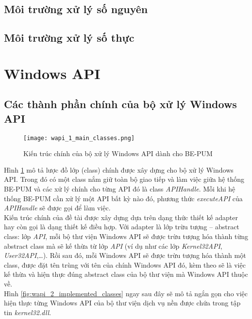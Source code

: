 	\subsection*{Môi trường xử lý số nguyên}
	
	\subsection*{Môi trường xử lý số thực}
		
\newpage
\section{Windows API}

	\subsection{Các thành phần chính của bộ xử lý Windows API} \label{sec:main_classes}

	\begin{figure}[htp]
	\centering
		\texttt{[image: wapi\_1\_main\_classes.png]}
		\caption{Kiến trúc chính của bộ xử lý Windows API dành cho BE-PUM}	
		\label{fig:wapi_1_main_classes}		
	\end{figure}

Hình \ref{fig:wapi_1_main_classes} mô tả lược đồ lớp (class) chính được xây dựng cho bộ xử lý Windows API. Trong đó có một class nắm giữ toàn bộ giao tiếp và làm việc giữa hệ thống BE-PUM và các xử lý chính cho từng API đó là class \textit{APIHandle}. Mỗi khi hệ thống BE-PUM cần xử lý một API bất kỳ nào đó, phương thức \textit{executeAPI} của \textit{APIHandle} sẽ được gọi để làm việc.\\

Kiến trúc chính của đề tài được xây dựng dựa trên dạng thức thiết kế adapter hay còn gọi là dạng thiết kế điều hợp. Với adapter là lớp trừu tượng – abstract class: lớp \textit{API}, mỗi bộ thư viện Windows API sẽ được trừu tượng hóa thành từng abstract class mà sẽ kế thừa từ lớp \textit{API} (ví dụ như các lớp \textit{Kernel32API}, \textit{User32API},…). Rồi sau đó, mỗi Windows API sẽ được trừu tượng hóa thành một class, được đặt tên trùng với tên của chính Windows API đó, kèm theo sẽ là việc kế thừa và hiện thực đúng abstract class của bộ thư viện mà Windows API thuộc về.\\

Hình \ref{fig:wapi_2_implemented_classes} ngay sau đây sẽ mô tả ngắn gọn cho việc hiện thực từng Windows API của bộ thư viện dịch vụ nền được chứa trong tập tin \textit{kernel32.dll}.


